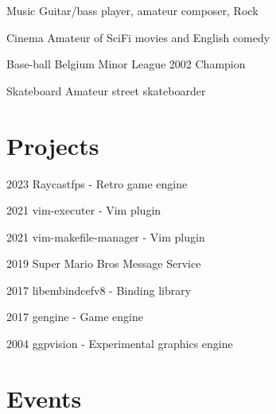 \documentclass[11pt,letterpaper]{report}
\begin{document}
    \begin{tablist}

        \item[Music]        \tab{}Guitar/bass player, amateur composer, Rock
        \item[Cinema]        \tab{}Amateur of SciFi movies and English comedy
        \item[Base-ball]    \tab{}Belgium Minor League 2002 Champion
        \item[Skateboard]   \tab{}Amateur street skateboarder

    \end{tablist}

    \section*{Projects}

    \begin{tablist}

        \item[2023]        \tab{}Raycastfps - Retro game engine
        \item[2021]        \tab{}vim-executer - Vim plugin
        \item[2021]        \tab{}vim-makefile-manager - Vim plugin
        \item[2019]        \tab{}Super Mario Bros Message Service
        \item[2017]        \tab{}libembindcefv8 - Binding library
        \item[2017]        \tab{}gengine - Game engine
        \item[2004]        \tab{}ggpvision - Experimental graphics engine

    \end{tablist}

    \section*{Events}
\end{document}
